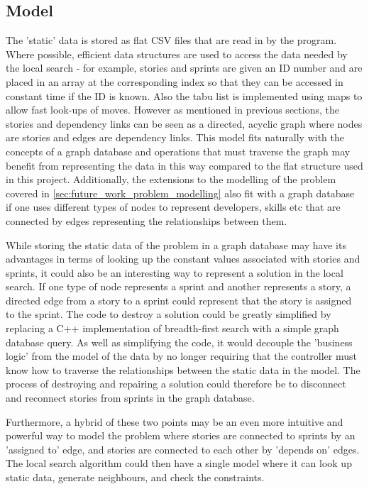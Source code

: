 \subsection{Model}
The 'static' data is stored as flat CSV files that are read in by the program. Where possible, efficient data structures are used to access the data needed by the local search - for example, stories and sprints are given an ID number and are placed in an array at the corresponding index so that they can be accessed in constant time if the ID is known. Also the tabu list is implemented using maps to allow fast look-ups of moves. However as mentioned in previous sections, the stories and dependency links can be seen as a directed, acyclic graph where nodes are stories and edges are dependency links. This model fits naturally with the concepts of a graph database and operations that must traverse the graph may benefit from representing the data in this way compared to the flat structure used in this project. Additionally, the extensions to the modelling of the problem covered in \cref{sec:future_work_problem_modelling} also fit with a graph database if one uses different types of nodes to represent developers, skills etc that are connected by edges representing the relationships between them.

While storing the static data of the problem in a graph database may have its advantages in terms of looking up the constant values associated with stories and sprints, it could also be an interesting way to represent a solution in the local search. If one type of node represents a sprint and another represents a story, a directed edge from a story to a sprint could represent that the story is assigned to the sprint. The code to destroy a solution could be greatly simplified by replacing a C++ implementation of breadth-first search with a simple graph database query. As well as simplifying the code, it would decouple the 'business logic' from the model of the data by no longer requiring that the controller must know how to traverse the relationships between the static data in the model. The process of destroying and repairing a solution could therefore be to disconnect and reconnect stories from sprints in the graph database.

Furthermore, a hybrid of these two points may be an even more intuitive and powerful way to model the problem where stories are connected to sprints by an 'assigned to' edge, and stories are connected to each other by 'depends on' edges. The local search algorithm could then have a single model where it can look up static data, generate neighbours, and check the constraints.

